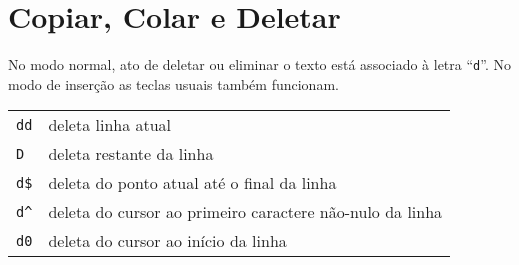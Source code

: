 \section{Copiar, Colar e Deletar}\label{sec:CopiarColarEDeletar}
No modo normal, ato de deletar ou eliminar o texto está associado
à letra ``\verb|d|''. No modo de inserção as teclas usuais também 
funcionam.

%
%
%

\begin{table}[htb]\begin{center} \begin{tabular}{ll} \hline
 \verb|dd| & deleta linha atual \\
 \verb|D|  & deleta restante da linha \\
 \verb|d$| & deleta do ponto atual até o final da linha \\
 \verb|d^| & deleta do cursor ao primeiro caractere não-nulo da linha \\
 \verb|d0| & deleta do cursor ao início da linha \\
\hline \end{tabular}\end{center}\end{table}

